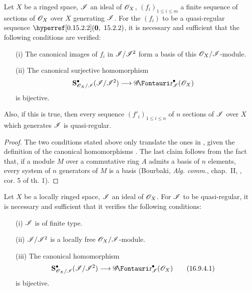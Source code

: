 \begin{proposition}[16.9.3]
\label{IV.16.9.3}
Let $X$ be a ringed space, $\mathscr{I}$ an ideal of $\mathscr{O}_X$, $(f_i)_{1 \leq i \leq m}$ a finite sequence of sections of $\mathscr{O}_X$ over $X$ generating $\mathscr{I}$.
For the $(f_i)$ to be a quasi-regular sequence $\sref[0]{0.15.2.2}$, it is necessary and sufficient that the following conditions are verified:
\begin{enumerate}
  \item[\rm{(i)}] The canonical images of $f_i$ in $\mathscr{I}/\mathscr{I}^2$ form a basis of this $\mathscr{O}_X/\mathscr{I}$-module.
  \item[\rm{(ii)}] The canonical surjective homomorphism 
  \[
    \bb{S}_{\sh{O}_X/\sh{I}}^\bullet (\sh{I}/\sh{I}^2) \to \shGr_{\sh{I}}^\bullet(\sh{O}_X) 
  \]
  is bijective.
\end{enumerate}

Also, if this is true, then every sequence $(f'_i)_{1 \leq i \leq n}$ of $n$ sections of $\mathscr{I}$ over $X$ which generates $\mathscr{I}$ is quasi-regular.
\end{proposition}


\begin{proof}
The two conditions stated above only translate the ones in , given the definition of the canonical homomorphisms .
The last claim follows from the fact that, if a module $M$ over a commutative ring $A$ admits a basis of $n$ elements, every system of $n$ generators of $M$ is a basis (Bourbaki, \emph{Alg. comm.}, chap.~II, , cor. 5 of th. 1).
\end{proof}

\begin{corollary}[16.9.4]
\label{IV.16.9.4}
Let $X$ be a locally ringed space, $\mathscr{I}$ an ideal of $\mathscr{O}_X$.
For $\mathscr{I}$ to be quasi-regular, it is necessary and sufficient that it verifies the following conditions:
\begin{enumerate}
  \item[\rm{(i)}] $\mathscr{I}$ is of finite type.
  \item[\rm{(ii)}] $\mathscr{I}/\mathscr{I}^2$ is a locally free $\mathscr{O}_X/\mathscr{I}$-module.
  \item[\rm{(iii)}] The canonical homomorphism
  \[
    \label{IV.16.9.4.1}
    \bb{S}_{\sh{O}_X/\sh{I}}^\bullet (\sh{I}/\sh{I}^2) \to \shGr_{\sh{I}}^\bullet(\sh{O}_X) 
    \tag{16.9.4.1}
  \]
  is bijective.
\end{enumerate}
\end{corollary}

